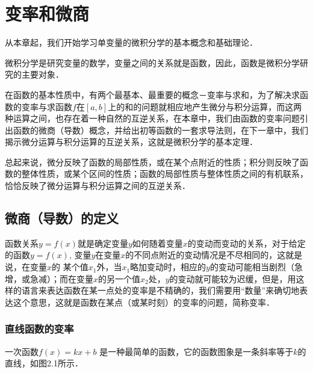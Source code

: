 
\chapter{变率和微商}

从本章起，我们开始学习单变量的微积分学的基本概念和基础理论．

微积分学是研究变量的数学，变量之间的关系就是函数，因此，函数是微积分学研究的主要对象．

在函数的基本性质中，有两个最基本、最重要的概念－变率与求和，为了解决求函数的变率与求函数$f$在$[a,b]$上的和的问题就相应地产生微分与积分运算，而这两种运算之间，也存在着一种自然的互逆关系，在本章中，我们由函数的变率问题引出函数的微商（导数）概念，并给出初等函数的一套求导法则，在下一章中，我们揭示微分运算与积分运算的互逆关系，这就是微积分学的基本定理．

总起来说，微分反映了函数的局部性质，或在某个点附近的性质；积分则反映了函数的整体性质，或某个区间的性质；函数的局部性质与整体性质之间的有机联系，恰恰反映了微分运算与积分运算之间的互逆关系．

\section{微商（导数）的定义}
函数关系$y=f(x)$就是确定变量$y$如何随着变量$x$的变动而变动的关系，对于给定的函数$y=f(x)$, 变量$y$在变量$x$的不同点附近的变动情况是不尽相同的，这就是说，在变量$x$的
某个值$x_1$外，当$x_1$略加变动时，相应的$y$的变动可能相当剧烈（急增，或急减）；而在变量$x$的另一个值$x_2$处，$y$的变动就可能较为迟缓，但是，用这样的语言来表达函数在某一点处的变率是不精确的，我们需要用“数量”来确切地表达这个意思，这就是函数在某点（或某时刻）的变率的问题，简称变率．

\subsection{直线函数的变率}
一次函数$f (x) =kx+b$
是一种最简单的函数，它的函数图象是一条斜率等于$k$的直线，如图2.1所示．
\begin{figure}[htp]
    \centering
{}
    \caption{}
\end{figure}

